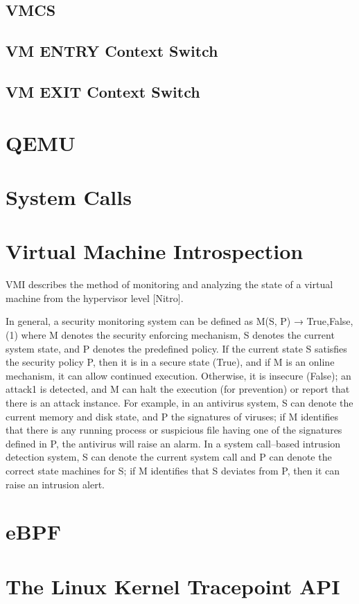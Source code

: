 \documentclass{report}
\begin{document}
\begin{spacing}{1.5}
\subsection{VMCS}
\subsection{VM ENTRY Context Switch}
\subsection{VM EXIT Context Switch}
\section{QEMU}
\section{System Calls}
\section{Virtual Machine Introspection}


VMI describes the method of monitoring and analyzing the state of a virtual machine from the hypervisor level [Nitro]. 

In general, a security monitoring system can be defined as
M(S, P) → {True,False}, (1)
where M denotes the security enforcing mechanism, S denotes the current system
state, and P denotes the predefined policy. If the current state S satisfies the security
policy P, then it is in a secure state (True), and if M is an online mechanism, it can
allow continued execution. Otherwise, it is insecure (False); an attack1 is detected, and
M can halt the execution (for prevention) or report that there is an attack instance.
For example, in an antivirus system, S can denote the current memory and disk state,
and P the signatures of viruses; if M identifies that there is any running process or
suspicious file having one of the signatures defined in P, the antivirus will raise an
alarm. In a system call–based intrusion detection system, S can denote the current
system call and P can denote the correct state machines for S; if M identifies that
S deviates from P, then it can raise an intrusion alert.


\section{eBPF}
\section{The Linux Kernel Tracepoint API}

\end{spacing}
\end{document}
